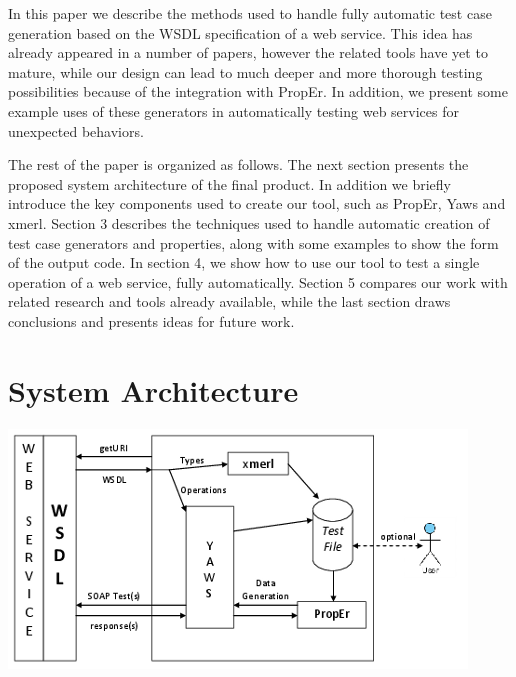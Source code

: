 \documentclass[submission,copyright,a4]{eptcs}
\begin{document}

In this paper we describe the methods used to handle fully automatic
test case generation based on the WSDL specification of a web service.
This idea has already appeared in a number of papers, however the 
related tools have yet to mature, while our design can lead to much 
deeper and more thorough testing possibilities because of the integration
with PropEr. In addition, we present some example uses of these generators 
in automatically testing web services for unexpected behaviors. 


The rest of the paper is organized as follows.
The next section presents the proposed system architecture of the final 
product. In addition we briefly introduce the key components used to 
create our tool, such as PropEr, Yaws and xmerl.
Section 3 describes the techniques used to handle automatic creation of
test case generators and properties, along with some examples to show 
the form of the output code. 
In section 4, we show how to use our tool to test a single operation of 
a web service, fully automatically.
Section 5 compares our work with related research and tools already 
available, while the last section draws conclusions and presents ideas 
for future work.


\section{System Architecture}


\includegraphics{PropErWebFramework.png}
\end{document}
